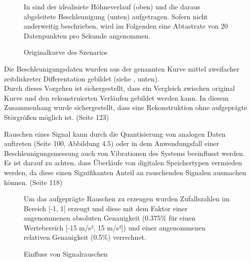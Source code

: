 \begin{figure}[ht!]
\vspace{0.25cm}
\begin{center}
\caption{Originalkurve des Szenarios}
\label{fig:SzeneOrigin}
\end{center}

\vspace{0.25cm}
In  sind der idealisiete Höhneverlauf (oben) und die daraus abgeleitete Beschleunigung (unten) aufgetragen. Sofern nicht anderweitig beschrieben, wird im Folgenden eine Abtastrate von 20 Datenpunkten pro Sekunde angenommen.
\end{figure}

Die Beschleunigungsdaten wurden aus der genannten Kurve mittel zweifacher zeitdiskreter Differentation gebildet (siehe , unten).\\
Durch dieses Vorgehen ist sichergestellt, dass ein Vergleich zwischen original Kurve und den rekonstruierten Verläufen gebildet werden kann. In diesem Zusammenhang wurde sichergestellt, dass eine Rekonstruktion ohne aufgeprägte Störgrößen möglich ist. (Seite 123)


Rauschen eines Signal kann durch die Quantisierung von analogen Daten auftreten  (Seite 100, Abbildung 4.5) oder in dem Anwendungsfall einer Beschleunigungsmessung auch von Vibrationen des Systems beeinflusst werden.
Es ist darauf zu achten, dass Überläufe von digitalen Speichertypen vermieden werden, da diese einen Signifikanten Anteil an rauschenden Signalen ausmachen können.  (Seite 118)

\begin{figure}[ht!]
\vspace{0.25cm}
\begin{center}
\caption{Einfluss von Signalrauschen}
\label{fig:SzeneNoise}
\end{center}

\vspace{0.25cm}
Um das aufgeprägte Rauschen zu erzeugen wurden Zufallszahlen im Bereich [-1, 1] erzeugt und diese mit dem Faktor einer angenommenen absoluten Genauigkeit (0.375\% für einen Wertebereich [-15 m/s², 15 m/s²]) und einer angenommenen relativen Genauigkeit (0.5\%) verrechnet.
\end{figure}

